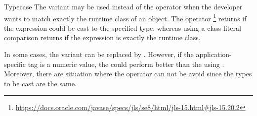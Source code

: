 \begin{pattern}{Typecase}
The  variant may be used instead of the  operator when the developer wants to match exactly the runtime class of an object.
The  operator%
\footnote{\url{https://docs.oracle.com/javase/specs/jls/se8/html/jls-15.html\#jls-15.20.2}}
returns  if the expression could be cast to the specified type,
whereas using a class literal comparison returns  if the expression is exactly the runtime class.

In some cases, the  variant can be replaced by .
However, if the application-specific tag is a numeric value,
the  could perform better than the  using .
Moreover, there are situation where the  operator can not be avoid since the types to be cast are the same.

\end{pattern}